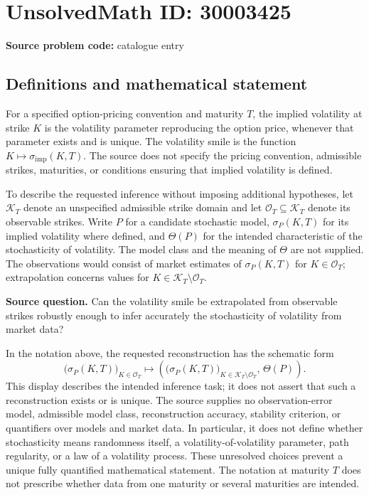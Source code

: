 \documentclass[11pt]{article}
\begin{document}
\section*{UnsolvedMath ID: 30003425}
\textbf{Source problem code:} catalogue entry
\subsection{Definitions and mathematical statement}
For a specified option-pricing convention and maturity \(T\), the implied volatility at strike \(K\) is the volatility parameter reproducing the option price, whenever that parameter exists and is unique. The volatility smile is the function \(K\mapsto\sigma_{\mathrm{imp}}(K,T)\). The source does not specify the pricing convention, admissible strikes, maturities, or conditions ensuring that implied volatility is defined.

To describe the requested inference without imposing additional hypotheses, let \(\mathcal K_T\) denote an unspecified admissible strike domain and let \(\mathcal O_T\subseteq\mathcal K_T\) denote its observable strikes. Write \(P\) for a candidate stochastic model, \(\sigma_P(K,T)\) for its implied volatility where defined, and \(\Theta(P)\) for the intended characteristic of the stochasticity of volatility. The model class and the meaning of \(\Theta\) are not supplied. The observations would consist of market estimates of \(\sigma_P(K,T)\) for \(K\in\mathcal O_T\); extrapolation concerns values for \(K\in\mathcal K_T\setminus\mathcal O_T\).

\textbf{Source question.} Can the volatility smile be extrapolated from observable strikes robustly enough to infer accurately the stochasticity of volatility from market data?

In the notation above, the requested reconstruction has the schematic form
\[
 \bigl(\sigma_P(K,T)\bigr)_{K\in\mathcal O_T}
 \longmapsto
 \left(\bigl(\sigma_P(K,T)\bigr)_{K\in\mathcal K_T\setminus\mathcal O_T},\,\Theta(P)\right).
\]
This display describes the intended inference task; it does not assert that such a reconstruction exists or is unique. The source supplies no observation-error model, admissible model class, reconstruction accuracy, stability criterion, or quantifiers over models and market data. In particular, it does not define whether stochasticity means randomness itself, a volatility-of-volatility parameter, path regularity, or a law of a volatility process. These unresolved choices prevent a unique fully quantified mathematical statement. The notation at maturity \(T\) does not prescribe whether data from one maturity or several maturities are intended.
\end{document}
